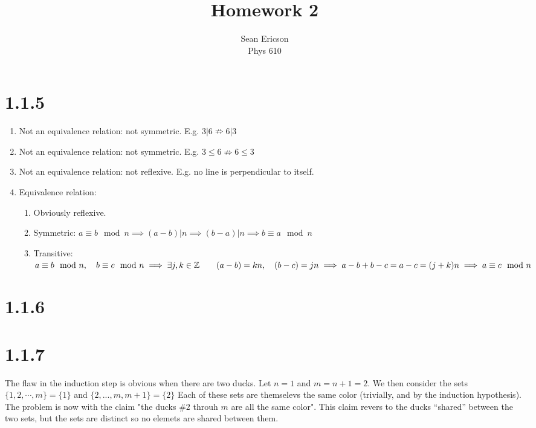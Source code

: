 \documentclass[12pt]{article}
\begin{document}
	
\title{Homework 2}
\author{Sean Ericson \\ Phys 610}
\maketitle

\section*{1.1.5}
\begin{enumerate}[label=(\alph*)]
    \item Not an equivalence relation: not symmetric. E.g. $3|6 \nRightarrow 6|3$
    \item Not an equivalence relation: not symmetric. E.g. $3\leq 6 \nRightarrow 6\leq 3$
    \item Not an equivalence relation: not reflexive. E.g. no line is perpendicular to itself.
    \item Equivalence relation:
    \begin{enumerate}
        \item Obviously reflexive.
        \item Symmetric: $a \equiv b \mod n \implies (a-b)|n \implies (b-a)|n \implies b \equiv a \mod n$
        \item Transitive: $a \equiv b \mod n, \quad b \equiv c \mod n \\ \implies \exists j,k \in \mathbb{Z} \qquad (a-b)=kn, \quad (b-c)=jn \\ \implies a-b+b-c = a-c = (j+k)n \implies a\equiv c \mod n$
    \end{enumerate}
\end{enumerate}


\section*{1.1.6}


\section*{1.1.7}
The flaw in the induction step is obvious when there are two ducks. Let $n=1$ and $m=n+1=2$. We then consider the sets $\{1,2,\cdots,m\} = \{1\}$ and $\{2,...,m,m+1\}=\{2\}$ Each of these sets are themselevs the same color (trivially, and by the induction hypothesis). The problem is now with the claim "the ducks $\#2$ throuh $m$ are all the same color". This claim revers to the ducks ``shared'' between the two sets, but the sets are distinct so no elemets are shared between them.
\end{document}
